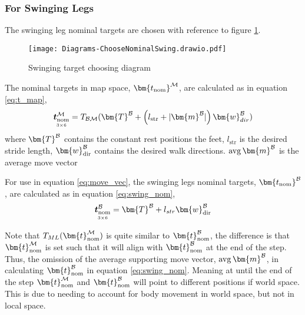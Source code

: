             \newpage
            \subsubsection{For Swinging Legs} \label{sec:swing}
                The swinging leg nominal targets are chosen with reference to figure \ref{fig:swinging_targ}.
                \begin{figure}[h]
                    \centering
                    \texttt{[image: Diagrams-ChooseNominalSwing.drawio.pdf]}
                    \caption{Swinging target choosing diagram} 
                    \label{fig:swinging_targ}
                \end{figure}

                \noindent
                The nominal targets in map space, \(\bm{t_\text{nom}} ^{\fmap}\), are calculated as in equation \ref{eq:t_map},
                \begin{equation} \label{eq:t_map}
                    \mdim{\boldsymbol{t}_\text{nom}^{\fmap}}{3}{6} = \transframe{\bm{T}^\fbody + \left(l_\text{str}+|\bm{m}^\fbody|\right)\bm{w}_{dir}^\fbody}{\fbody}{\fmap}
                \end{equation}
                where \(\bm{T}^\fbody\) contains the constant rest positions the feet, \(l_\text{str}\) is the desired stride length, \(\bm{w}_\text{dir}^\fbody\)
                contains the desired walk directions. \(\avg\bm{m}^\fbody\) is the average move vector 

                For use in equation \ref{eq:move_vec}, the swinging legs nominal targets, \(\bm{t_\text{nom}} ^\fbody\), are calculated as 
                in equation \ref{eq:swing_nom},
                \begin{equation} \label{eq:swing_nom}
                    \mdim{\boldsymbol{t}_\text{nom}^\fbody}{3}{6} = \bm{T}^\fbody + l_{str}\bm{w}_\text{dir}^\fbody
                \end{equation}

                Note that \(\transframe{\bm{t}_\text{nom}^{\fmap}}{M}{L}\) is quite similar to \(\bm{t}_\text{nom}^\fbody\), the difference is that \(\bm{t}_\text{nom}^{\fmap}\) is set such that it
                will align with \(\bm{t}_\text{nom}^\fbody\)
                at the end of the step. Thus, the omission of the average supporting move vector, \(\avg \bm{m}^\fbody\), in calculating \(\bm{t}_\text{nom}^\fbody\)
                in equation \ref{eq:swing_nom}.
                Meaning at until the end of the step \(\bm{t}_\text{nom}\inrefframe{M}\) and \(\bm{t}_\text{nom}^\fbody\) will point 
                to different positions if world space. This is due to needing to account for body movement in world space, but not in local space.

